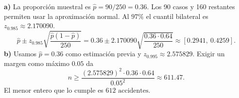 \textbf{a)} La proporción muestral es $\hat p=90/250=0.36$.
Los 90 casos y 160 restantes permiten usar la aproximación normal.
Al $97\%$ el cuantil bilateral es $z_{0.985}\approx2.170090$.
\[
\hat p\pm z_{0.985}\sqrt{\frac{\hat p(1-\hat p)}{250}}
=0.36\pm2.170090\sqrt{\frac{0.36\cdot0.64}{250}}
\approx\boxed{[0.2941,\ 0.4259]}.
\]
\textbf{b)} Usamos $\hat p=0.36$ como estimación previa y
$z_{0.995}\approx2.575829$. Exigir un margen como máximo $0.05$ da
\[
n\ge\frac{(2.575829)^2\cdot0.36\cdot0.64}{0.05^2}\approx611.47.
\]
El menor entero que lo cumple es $\boxed{612\text{ accidentes}}$.
